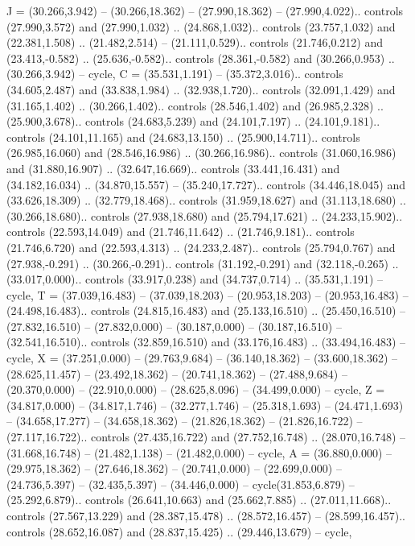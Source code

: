 {J} = {(30.266,3.942) -- (30.266,18.362) -- (27.990,18.362) -- (27.990,4.022).. controls (27.990,3.572) and (27.990,1.032) .. (24.868,1.032).. controls (23.757,1.032) and (22.381,1.508) .. (21.482,2.514) -- (21.111,0.529).. controls (21.746,0.212) and (23.413,-0.582) .. (25.636,-0.582).. controls (28.361,-0.582) and (30.266,0.953) .. (30.266,3.942) -- cycle},
{C} = {(35.531,1.191) -- (35.372,3.016).. controls (34.605,2.487) and (33.838,1.984) .. (32.938,1.720).. controls (32.091,1.429) and (31.165,1.402) .. (30.266,1.402).. controls (28.546,1.402) and (26.985,2.328) .. (25.900,3.678).. controls (24.683,5.239) and (24.101,7.197) .. (24.101,9.181).. controls (24.101,11.165) and (24.683,13.150) .. (25.900,14.711).. controls (26.985,16.060) and (28.546,16.986) .. (30.266,16.986).. controls (31.060,16.986) and (31.880,16.907) .. (32.647,16.669).. controls (33.441,16.431) and (34.182,16.034) .. (34.870,15.557) -- (35.240,17.727).. controls (34.446,18.045) and (33.626,18.309) .. (32.779,18.468).. controls (31.959,18.627) and (31.113,18.680) .. (30.266,18.680).. controls (27.938,18.680) and (25.794,17.621) .. (24.233,15.902).. controls (22.593,14.049) and (21.746,11.642) .. (21.746,9.181).. controls (21.746,6.720) and (22.593,4.313) .. (24.233,2.487).. controls (25.794,0.767) and (27.938,-0.291) .. (30.266,-0.291).. controls (31.192,-0.291) and (32.118,-0.265) .. (33.017,0.000).. controls (33.917,0.238) and (34.737,0.714) .. (35.531,1.191) -- cycle},
{T} = {(37.039,16.483) -- (37.039,18.203) -- (20.953,18.203) -- (20.953,16.483) -- (24.498,16.483).. controls (24.815,16.483) and (25.133,16.510) .. (25.450,16.510) -- (27.832,16.510) -- (27.832,0.000) -- (30.187,0.000) -- (30.187,16.510) -- (32.541,16.510).. controls (32.859,16.510) and (33.176,16.483) .. (33.494,16.483) -- cycle},
{X} = {(37.251,0.000) -- (29.763,9.684) -- (36.140,18.362) -- (33.600,18.362) -- (28.625,11.457) -- (23.492,18.362) -- (20.741,18.362) -- (27.488,9.684) -- (20.370,0.000) -- (22.910,0.000) -- (28.625,8.096) -- (34.499,0.000) -- cycle},
{Z} = {(34.817,0.000) -- (34.817,1.746) -- (32.277,1.746) -- (25.318,1.693) -- (24.471,1.693) -- (34.658,17.277) -- (34.658,18.362) -- (21.826,18.362) -- (21.826,16.722) -- (27.117,16.722).. controls (27.435,16.722) and (27.752,16.748) .. (28.070,16.748) -- (31.668,16.748) -- (21.482,1.138) -- (21.482,0.000) -- cycle},
{A} = {(36.880,0.000) -- (29.975,18.362) -- (27.646,18.362) -- (20.741,0.000) -- (22.699,0.000) -- (24.736,5.397) -- (32.435,5.397) -- (34.446,0.000) -- cycle(31.853,6.879) -- (25.292,6.879).. controls (26.641,10.663) and (25.662,7.885) .. (27.011,11.668).. controls (27.567,13.229) and (28.387,15.478) .. (28.572,16.457) -- (28.599,16.457).. controls (28.652,16.087) and (28.837,15.425) .. (29.446,13.679) -- cycle},
